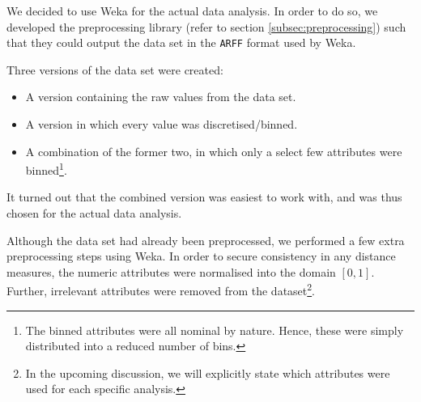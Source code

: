 
We decided to use Weka for the actual data analysis. In order to do so, we developed the preprocessing library (refer to section \ref{subsec:preprocessing}) such that they could output the data set in the \texttt{ARFF} format used by Weka.

Three versions of the data set were created:

\begin{itemize}
\item A version containing the raw values from the data set.
\item A version in which every value was discretised/binned.
\item A combination of the former two, in which only a select few attributes were binned\footnote{The binned attributes were all nominal by nature. Hence, these were simply distributed into a reduced number of bins.}.
\end{itemize}

It turned out that the combined version was easiest to work with, and was thus chosen for the actual data analysis.

Although the data set had already been preprocessed, we performed a few extra preprocessing steps using Weka. In order to secure consistency in any distance measures, the numeric attributes were normalised into the domain $[0, 1]$. Further, irrelevant attributes were removed from the dataset\footnote{In the upcoming discussion, we will explicitly state which attributes were used for each specific analysis.}.

